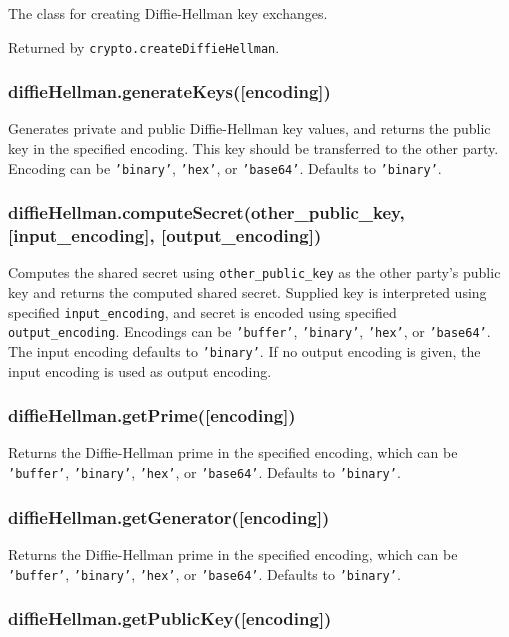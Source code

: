 The class for creating Diffie-Hellman key exchanges.

Returned by \texttt{crypto.createDiffieHellman}.

\subsubsection{diffieHellman.generateKeys({[}encoding{]})}

Generates private and public Diffie-Hellman key values, and returns the
public key in the specified encoding. This key should be transferred to
the other party. Encoding can be \texttt{'binary'}, \texttt{'hex'}, or
\texttt{'base64'}. Defaults to \texttt{'binary'}.

\subsubsection{diffieHellman.computeSecret(other\_public\_key,
{[}input\_encoding{]}, {[}output\_encoding{]})}

Computes the shared secret using \texttt{other\_public\_key} as the
other party's public key and returns the computed shared secret.
Supplied key is interpreted using specified \texttt{input\_encoding},
and secret is encoded using specified \texttt{output\_encoding}.
Encodings can be \texttt{'buffer'}, \texttt{'binary'}, \texttt{'hex'},
or \texttt{'base64'}. The input encoding defaults to \texttt{'binary'}.
If no output encoding is given, the input encoding is used as output
encoding.

\subsubsection{diffieHellman.getPrime({[}encoding{]})}

Returns the Diffie-Hellman prime in the specified encoding, which can be
\texttt{'buffer'}, \texttt{'binary'}, \texttt{'hex'}, or
\texttt{'base64'}. Defaults to \texttt{'binary'}.

\subsubsection{diffieHellman.getGenerator({[}encoding{]})}

Returns the Diffie-Hellman prime in the specified encoding, which can be
\texttt{'buffer'}, \texttt{'binary'}, \texttt{'hex'}, or
\texttt{'base64'}. Defaults to \texttt{'binary'}.

\subsubsection{diffieHellman.getPublicKey({[}encoding{]})}

